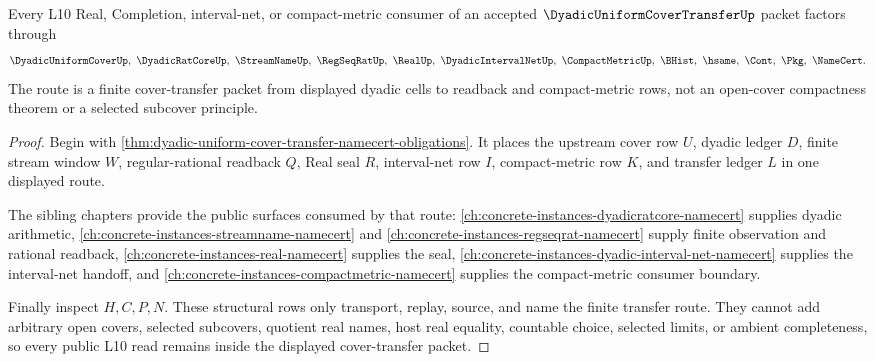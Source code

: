 \begin{theorem}
\label{thm:dyadic-uniform-cover-transfer-l10-route}
Every L10 Real, Completion, interval-net, or compact-metric consumer of an accepted $\DyadicUniformCoverTransferUp$ packet factors through
$$
\DyadicUniformCoverUp,\ \DyadicRatCoreUp,\ \StreamNameUp,\ \RegSeqRatUp,\ \RealUp,\ \DyadicIntervalNetUp,\ \CompactMetricUp,\ \BHist,\ \hsame,\ \Cont,\ \Pkg,\ \NameCert .
$$
The route is a finite cover-transfer packet from displayed dyadic cells to readback and compact-metric rows, not an open-cover compactness theorem or a selected subcover principle.
\end{theorem}
\begin{proof}
Begin with \autoref{thm:dyadic-uniform-cover-transfer-namecert-obligations}. It places the upstream cover row $U$, dyadic ledger $D$, finite stream window $W$, regular-rational readback $Q$, Real seal $R$, interval-net row $I$, compact-metric row $K$, and transfer ledger $L$ in one displayed route.

The sibling chapters provide the public surfaces consumed by that route: \autoref{ch:concrete-instances-dyadicratcore-namecert} supplies dyadic arithmetic, \autoref{ch:concrete-instances-streamname-namecert} and \autoref{ch:concrete-instances-regseqrat-namecert} supply finite observation and rational readback, \autoref{ch:concrete-instances-real-namecert} supplies the seal, \autoref{ch:concrete-instances-dyadic-interval-net-namecert} supplies the interval-net handoff, and \autoref{ch:concrete-instances-compactmetric-namecert} supplies the compact-metric consumer boundary.

Finally inspect $H,C,P,N$. These structural rows only transport, replay, source, and name the finite transfer route. They cannot add arbitrary open covers, selected subcovers, quotient real names, host real equality, countable choice, selected limits, or ambient completeness, so every public L10 read remains inside the displayed cover-transfer packet.
\end{proof}


